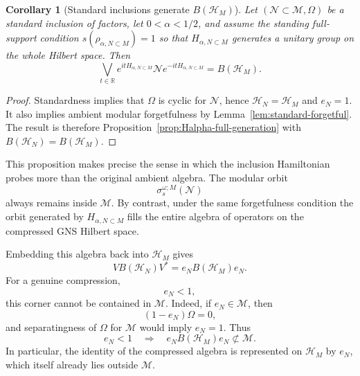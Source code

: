 \documentclass[a4paper,11pt]{article}
\newtheorem{corollary}[theorem]{Corollary}
\theoremstyle{definition}
\begin{document}
\begin{corollary}[Standard inclusions generate $B(\mathcal H_M)$]
\label{cor:standard-Halpha-full-generation}
Let $(\mathcal N\subset\mathcal M,\Omega)$ be a standard inclusion of factors,
let $0<\alpha<1/2$, and assume the standing full-support condition
$s(\rho_{\alpha,N\subset M})=1$ so that $H_{\alpha,N\subset M}$ generates a
unitary group on the whole Hilbert space. Then
\begin{equation}
    \boxed{
    \bigvee_{t\in\mathbb R}
    e^{itH_{\alpha,N\subset M}}
    \mathcal N
    e^{-itH_{\alpha,N\subset M}}
    =B(\mathcal H_M).
    }
    \label{eq:standard-Halpha-full-BHM}
\end{equation}
\end{corollary}
\begin{proof}
Standardness implies that $\Omega$ is cyclic for $\mathcal N$, hence
$\mathcal H_N=\mathcal H_M$ and $e_N=1$. It also implies ambient modular
forgetfulness by Lemma~\ref{lem:standard-forgetful}. The result is therefore
Proposition~\ref{prop:Halpha-full-generation} with
$B(\mathcal H_N)=B(\mathcal H_M)$.
\end{proof}

This proposition makes precise the sense in which the inclusion Hamiltonian
probes more than the original ambient algebra. The modular orbit
\begin{equation}
    \sigma_s^{\omega;M}(\mathcal N)
\end{equation}
always remains inside $\mathcal M$. By contrast, under the same
forgetfulness condition the orbit generated by $H_{\alpha,N\subset M}$
fills the entire algebra of operators on the compressed GNS Hilbert space.

Embedding this algebra back into $\mathcal H_M$ gives
\begin{equation}
    V B(\mathcal H_N)V^*
    =
    e_NB(\mathcal H_M)e_N .
    \label{eq:corner-BHN}
\end{equation}
For a genuine compression,
\begin{equation}
    e_N<1,
\end{equation}
this corner cannot be contained in $\mathcal M$. Indeed, if
$e_N\in\mathcal M$, then
\begin{equation}
    (1-e_N)\Omega=0,
\end{equation}
and separatingness of $\Omega$ for $\mathcal M$ would imply
$e_N=1$. Thus
\begin{equation}
    \boxed{
    e_N<1
    \quad\Longrightarrow\quad
    e_NB(\mathcal H_M)e_N
    \not\subset\mathcal M.
    }
    \label{eq:corner-outside-M}
\end{equation}
In particular, the identity of the compressed algebra is represented on
$\mathcal H_M$ by $e_N$, which itself already lies outside $\mathcal M$.
\end{document}
